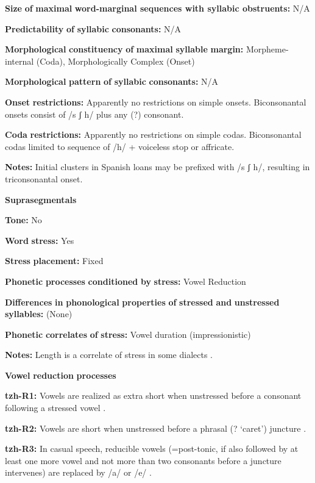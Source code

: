 \textbf{Size} \textbf{of} \textbf{maximal} \textbf{word{}-marginal sequences with syllabic obstruents:} N/A

\textbf{Predictability} \textbf{of} \textbf{syllabic} \textbf{consonants:} N/A

\textbf{Morphological} \textbf{constituency} \textbf{of} \textbf{maximal} \textbf{syllable} \textbf{margin:} Morpheme-internal (Coda), Morphologically Complex (Onset)

\textbf{Morphological} \textbf{pattern} \textbf{of} \textbf{syllabic} \textbf{consonants:} N/A

\textbf{Onset} \textbf{restrictions:} Apparently no restrictions on simple onsets. Biconsonantal onsets consist of /s ʃ h/ plus any (?) consonant.

\textbf{Coda} \textbf{restrictions:} Apparently no restrictions on simple codas. Biconsonantal codas limited to sequence of /h/ + voiceless stop or affricate.

\textbf{Notes:} Initial clusters in Spanish loans may be prefixed with /s ʃ h/, resulting in triconsonantal onset.

\textbf{Suprasegmentals}

\textbf{Tone:} No

\textbf{Word} \textbf{stress:} Yes

\textbf{Stress} \textbf{placement:} Fixed

\textbf{Phonetic} \textbf{processes} \textbf{conditioned} \textbf{by} \textbf{stress:} Vowel Reduction

\textbf{Differences} \textbf{in} \textbf{phonological} \textbf{properties} \textbf{of} \textbf{stressed} \textbf{and} \textbf{unstressed} \textbf{syllables:} (None)

\textbf{Phonetic} \textbf{correlates} \textbf{of} \textbf{stress:} Vowel duration (impressionistic)

\textbf{Notes:} Length is a correlate of stress in some dialects \citep[23]{Polian2006}.

\textbf{Vowel} \textbf{reduction} \textbf{processes}

\textbf{tzh-R1:} Vowels are realized as extra short when unstressed before a consonant following a stressed vowel \citep[12]{Kaufman1971}.

\textbf{tzh-R2:} Vowels are short when unstressed before a phrasal (? ‘caret’) juncture \citep[12]{Kaufman1971}.

\textbf{tzh-R3:} In casual speech, reducible vowels (=post-tonic, if also followed by at least one more vowel and not more than two consonants before a juncture intervenes) are replaced by /a/ or /e/ \citep[26-7]{Kaufman1971}.

